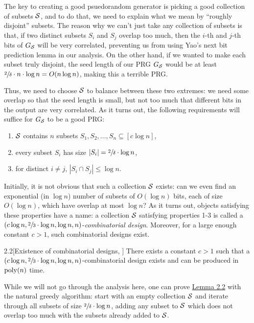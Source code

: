 \documentclass[11pt]{article}
\begin{document}
\noindent
\fi
The key to creating a good psuedorandom generator is picking a good collection of subsets $\mathcal{S}$, and to do that, we need to explain what we mean by ``roughly disjoint'' subsets. The reason why we can't just take any collection of subsets is that, if two distinct subsets $S_i$ and $S_j$ overlap too much, then the $i$-th and $j$-th bits of $G_{\mathcal{S}}$ will be very correlated, preventing us from using Yao's next bit prediction lemma in our analysis. On the other hand, if we wanted to make each subset truly disjoint, the seed length of our PRG $G_{\mathcal{S}}$ would be at least $\sfrac{2}{\delta} \cdot n \cdot \log n = O(n \log n)$, making this a terrible PRG.

Thus, we need to choose $\mathcal{S}$ to balance between these two extremes: we need some overlap so that the seed length is small, but not too much that different bits in the output are very correlated. As it turns out, the following requirements will suffice for $G_{\mathcal{S}}$ to be a good PRG:
\begin{enumerate}
    \item $\mathcal{S}$ contains $n$ subsets $S_1, S_2, \ldots, S_n \subseteq [c \log n]$,
    \item every subset $S_i$ has size $|S_i| = \sfrac{2}{\delta} \cdot \log n$,
    \item for distinct $i \neq j$, $|S_i \cap S_j| \leq \log n$.
\end{enumerate}
Initially, it is not obvious that such a collection $\mathcal{S}$ exists: can we even find an exponential (in $\log n$) number of subsets of $O(\log n)$ bits, each of size $O(\log n)$, which have overlap at most $\log n$? As it turns out, objects satisfying these properties have a name: a collection $\mathcal{S}$ satisfying properties 1-3 is called a $(c \log n, \sfrac{2}{3} \cdot \log n, \log n, n)$-\emph{combinatorial design}. Moreover, for a large enough constant $c > 1$, such combinatorial designs exist.

\begin{lemma}{2.2}[Existence of combinatorial designs, \cite{NW94}]\label{l-2-2}
    There exists a constant $c > 1$ such that a $(c \log n, \sfrac{2}{3} \cdot \log n, \log n, n)$-combinatorial design exists and can be produced in $\mathrm{poly}(n)$ time.
\end{lemma}

While we will not go through the analysis here, one can prove \hyperref[l-2-2]{Lemma 2.2} with the natural greedy algorithm: start with an empty collection $\mathcal{S}$ and iterate through all subsets of size $\sfrac{2}{\delta} \cdot \log n$, adding any subset to $\mathcal{S}$ which does not overlap too much with the subsets already added to $\mathcal{S}$. 
\end{document}
